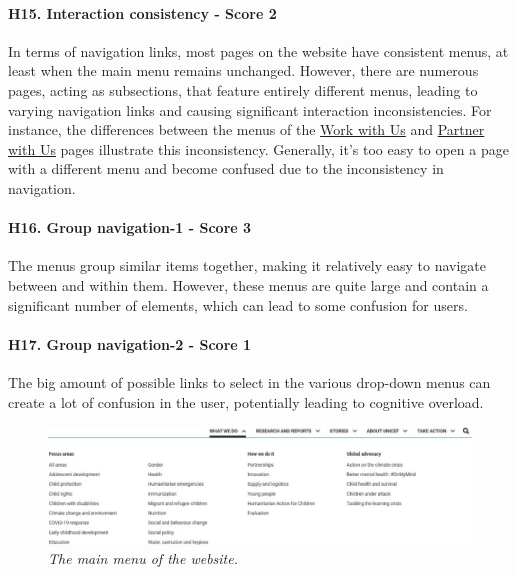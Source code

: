 \paragraph{H15. Interaction consistency - Score 2}	In terms of navigation links, most pages on the website have consistent menus, at least when the main menu remains unchanged. However, there are numerous pages, acting as subsections, that feature entirely different menus, leading to varying navigation links and causing significant interaction inconsistencies.
\newline For instance, the differences between the menus of the \href{https://www.unicef.org/careers/}{Work with Us} and \href{https://www.unicef.org/partnerships}{Partner with Us} pages illustrate this inconsistency. Generally, it's too easy to open a page with a different menu and become confused due to the inconsistency in navigation.
\newline
\paragraph{H16. Group navigation-1 - Score 3}	The menus group similar items together, making it relatively easy to navigate between and within them. However, these menus are quite large and contain a significant number of elements, which can lead to some confusion for users.
\newline
\paragraph{H17. Group navigation-2 - Score 1}	The big amount of possible links to select in the various drop-down menus can create a lot of confusion in the user, potentially leading to cognitive overload.
\begin{figure}[!h]
	\begin{center}
		\includegraphics[width=\textwidth]{Picture11.jpg}
		\captionsetup{font=small}
		\caption{\textit{The main menu of the website.}}
	\end{center}
\end{figure}
\newline
